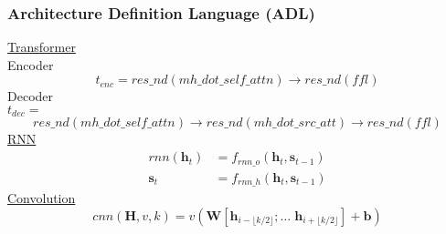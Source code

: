 \begin{frame}
    \frametitle{Architecture Definition Language (ADL)}
    \vspace{-1em}
    \underline{Transformer}\\
    Encoder
    \vspace{-1.5em}
    \[
        t_{enc} = res\_nd(mh\_dot\_self\_attn)\rightarrow res\_nd(ffl)
    \]
    Decoder
    \\$t_{dec} = $
    \vspace{-1em}
    \[
        res\_nd(mh\_dot\_self\_attn)\rightarrow
        res\_nd(mh\_dot\_src\_att)\rightarrow res\_nd(ffl)
    \]
    \underline{RNN}
    \vspace{-1em}
    \begin{align*}
        rnn(\textbf{h}_t) &= f_{rnn\_o}(\textbf{h}_t,\textbf{s}_{t-1})\\
        \textbf{s}_t &= f_{rnn\_h}(\textbf{h}_t,\textbf{s}_{t-1})
    \end{align*}
    \underline{Convolution}
    \vspace{-1em}
    \[
        cnn(\textbf{H},v,k) =
        v(\textbf{W}[\textbf{h}_{i-\lfloor{k/2}\rfloor};
        \dots\;
        \textbf{h}_{i+\lfloor{k/2}\rfloor} ]+\textbf{b})
    \]
\end{frame}
